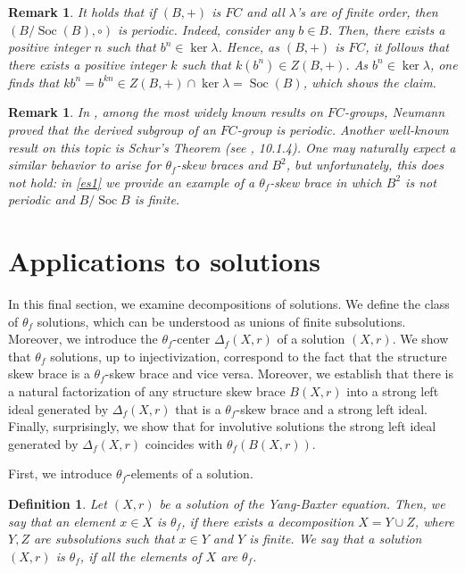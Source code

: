 \documentclass{amsart}
\newcommand{\Soc}{\operatorname{Soc}}
\newtheorem{defn}[thm]{Definition}
\newtheorem{rem}[thm]{Remark}
\begin{document}
\begin{rem}
    It holds that if $(B,+)$ is $FC$ and all $\lambda$'s are of finite order, then $(B/\Soc(B),\circ)$ is periodic. Indeed, consider any $b \in B$. Then, there exists a positive integer $n$ such that $b^n \in \ker \lambda$. Hence, as $(B,+)$ is $FC$, it follows that there exists a positive integer $k$ such that $k (b^n) \in Z(B,+)$. As $b^n \in \ker \lambda$, one finds that $kb^n = b^{kn} \in Z(B,+) \cap \ker \lambda=\Soc(B)$, which shows the claim.
\end{rem}
\begin{rem}
    In \cite{neumann}, among the most widely known results on $FC$-groups, Neumann proved that the derived subgroup of an $FC$-group is periodic. Another well-known result on this topic is Schur's Theorem (see \cite{robinson2}, 10.1.4). One may naturally expect a similar behavior to arise for $\theta_f$-skew braces and $B^2$, but unfortunately, this does not hold: in \cref{es1} we provide an example of a $\theta_f$-skew brace in which $B^2$ is not periodic and $B/\Soc B$ is finite.
\end{rem}


\section{Applications to solutions}\label{secsolution}

 In this final section, we examine decompositions of solutions. We define the class of $\theta_f$ solutions, which can be understood as unions of finite subsolutions. Moreover, we introduce the $\theta_f$-center $\Delta_f(X,r)$ of a solution $(X,r)$. We show that $\theta_f$ solutions, up to injectivization, correspond to the fact that the structure skew brace is a $\theta_f$-skew brace and vice versa. Moreover, we establish that there is a natural factorization of any structure skew brace $B(X,r)$ into a strong left ideal generated by $\Delta_f(X,r)$ that is a $\theta_f$-skew brace and a strong left ideal. Finally, surprisingly, we show that for involutive solutions the strong left ideal generated by $\Delta_f(X,r)$ coincides with $\theta_f(B(X,r))$.

First, we introduce $\theta_f$-elements of a solution.
\begin{defn}
    Let $(X,r)$ be a solution of the Yang-Baxter equation. Then, we say that an element $x \in X$ is $\theta_f$, if there exists a decomposition $X=Y \cup Z$, where $Y, Z$ are subsolutions such that $x \in Y$ and $Y$ is finite. We say that a solution $(X,r)$ is $\theta_f$, if all the elements of $X$ are $\theta_f$.
\end{defn}
\end{document}
